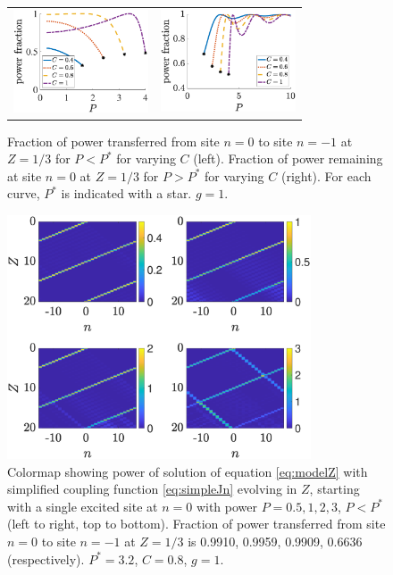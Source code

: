 \documentclass[reprint, amsmath,amssymb,aps,pre]{revtex4-2}
\begin{document}
\begin{figure}
    \centering
    \begin{tabular}{cc}
    \includegraphics[width=4cm]{powerfractransfer} &
    \includegraphics[width=4cm]{powerfracremain.eps}
    \end{tabular}
    \caption{Fraction of power transferred from site $n=0$ to site $n=-1$ at $Z=1/3$ for $P<P^*$ for varying $C$ (left). Fraction of power remaining at site $n=0$ at $Z=1/3$ for $P>P^*$ for varying $C$ (right). For each curve, $P^*$ is indicated with a star. $g=1$.}
    \label{fig:powertransfer}
\end{figure}

\begin{figure}
    \centering
    \includegraphics[width=9cm]{timestepsimplebelowpstar.eps}
    \caption{Colormap showing power of solution of equation \cref{eq:modelZ} with simplified coupling function \cref{eq:simpleJn} evolving in $Z$, starting with a single excited site at $n=0$ with power $P=0.5,1,2,3$, $P<P^*$ (left to right, top to bottom). Fraction of power transferred from site $n=0$ to site $n=-1$ at $Z=1/3$ is 0.9910, 0.9959, 0.9909, 0.6636 (respectively). $P^*=3.2$, $C=0.8$, $g=1$.}
    \label{fig:timestepsimplebelowpstar}
\end{figure}
\end{document}
